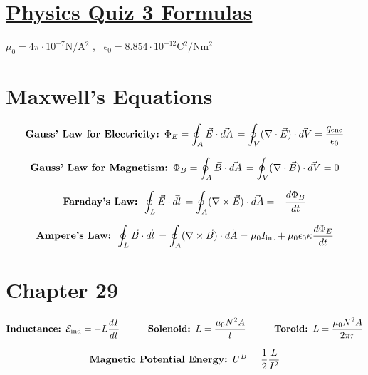\documentclass[fleqn,12pt]{article}
\begin{document}
\setlength{\abovedisplayskip}{2pt}
\setlength{\belowdisplayskip}{2pt}
\section*{\LARGE\underline{Physics Quiz 3 Formulas}}
$ \mu_0 = 4\pi \cdot 10^{-7} \si{\newton\per\ampere^2}$ , \, 
$\epsilon_0 = 8.854 \cdot 10^{-12} \si{\coulomb^2\per\newton\meter^2}$
\section*{Maxwell's Equations}
\begin{equation} \label{eq1}
 \mbox{\textbf{Gauss' Law for Electricity: }}\Phi_{E} = 
    \oint_A \vec{E} \cdot \vec{dA} \, = \oint_V ( \nabla \cdot \vec{E}) \cdot \vec{dV}
= \frac{q_\mathrm{enc}}{\epsilon_0}
\end{equation}

\begin{equation} \label{eq1}
 \mbox{\textbf{Gauss' Law for Magnetism: }}\Phi_{B} = 
    \oint_A \vec{B} \cdot \vec{dA} \, = \oint_V ( \nabla \cdot \vec{B}) \cdot \vec{dV}
= 0
\end{equation}

\begin{equation} \label{eq1}
 \mbox{\textbf{Faraday's Law: }}
    \oint_L \vec{E} \cdot \vec{dl} \, = \oint_A ( \nabla \times \vec{E}) \cdot \vec{dA}
= - \frac{d\Phi_{B}}{dt}
\end{equation}

\begin{equation} \label{eq1}
 \mbox{\textbf{Ampere's Law: }}
    \oint_L \vec{B} \cdot \vec{dl} \, = \oint_A ( \nabla \times \vec{B}) \cdot \vec{dA}
= \mu_{0}I_\mathrm{int} + \mu_{0}\epsilon_{0}\kappa\frac{d\Phi_{E}}{dt}
\end{equation}

\section*{Chapter 29}

\begin{equation} \label{eq1}
 \mbox{\textbf{Inductance: }}\mathcal{E}_\mathrm{ind} = -L \frac{dI}{dt}
 \quad \quad \quad \mbox{\textbf{Solenoid: }}L = \frac{\mu_0 N^2 A}{l}
 \quad \quad \quad \mbox{\textbf{Toroid: }}L = \frac{\mu_0 N^2 A}{2\pi r}
\end{equation}

\begin{equation}
    \label{eq2}
   \mbox{\textbf{Magnetic Potential Energy: }} U^B = \frac{1}{2}\frac{L}{I^2}
\end{equation}
\end{document}
